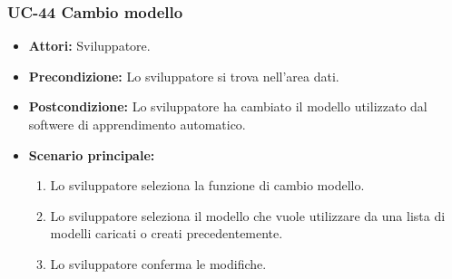 	\subsubsection{UC-44 Cambio modello}
	\begin{itemize}					
			\item \textbf{Attori:} Sviluppatore.
			\item \textbf{Precondizione:} Lo sviluppatore si trova nell'area dati.
			\item \textbf{Postcondizione:} Lo sviluppatore ha cambiato il modello utilizzato dal softwere di apprendimento automatico.
			\item \textbf{Scenario principale:}
				\begin{enumerate}
				\item Lo sviluppatore seleziona la funzione di cambio modello.
				\item Lo sviluppatore seleziona il modello che vuole utilizzare da una lista di modelli caricati o creati precedentemente.
				\item Lo sviluppatore conferma le modifiche. 
				\end{enumerate}	
		\end{itemize}		
	